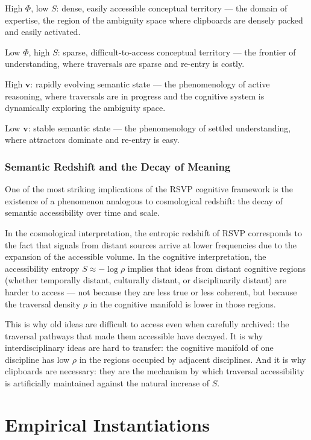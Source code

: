 \documentclass[12pt,oneside]{book}
\theoremstyle{plain}
\theoremstyle{definition}
\theoremstyle{plain}
\begin{document}
High $\Phi$, low $S$: dense, easily accessible conceptual territory — the domain of expertise, the region of the ambiguity space where clipboards are densely packed and easily activated.

Low $\Phi$, high $S$: sparse, difficult-to-access conceptual territory — the frontier of understanding, where traversals are sparse and re-entry is costly.

High $\mathbf{v}$: rapidly evolving semantic state — the phenomenology of active reasoning, where traversals are in progress and the cognitive system is dynamically exploring the ambiguity space.

Low $\mathbf{v}$: stable semantic state — the phenomenology of settled understanding, where attractors dominate and re-entry is easy.

\section{Semantic Redshift and the Decay of Meaning}

One of the most striking implications of the RSVP cognitive framework is the existence of a phenomenon analogous to cosmological redshift: the decay of semantic accessibility over time and scale.

In the cosmological interpretation, the entropic redshift of RSVP corresponds to the fact that signals from distant sources arrive at lower frequencies due to the expansion of the accessible volume. In the cognitive interpretation, the accessibility entropy $S \approx -\log \rho$ implies that ideas from distant cognitive regions (whether temporally distant, culturally distant, or disciplinarily distant) are harder to access — not because they are less true or less coherent, but because the traversal density $\rho$ in the cognitive manifold is lower in those regions.

This is why old ideas are difficult to access even when carefully archived: the traversal pathways that made them accessible have decayed. It is why interdisciplinary ideas are hard to transfer: the cognitive manifold of one discipline has low $\rho$ in the regions occupied by adjacent disciplines. And it is why clipboards are necessary: they are the mechanism by which traversal accessibility is artificially maintained against the natural increase of $S$.

\part{Empirical Instantiations}
\end{document}
